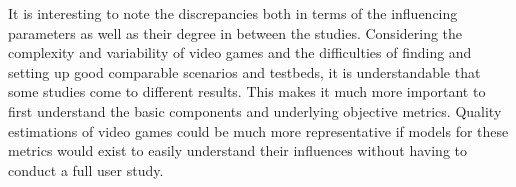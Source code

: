 It is interesting to note the discrepancies both in terms of the influencing parameters as well as their degree in between the studies. Considering the complexity and variability of video games and the difficulties of finding and setting up good comparable scenarios and testbeds, it is understandable that some studies come to different results. This makes it much more important to first understand the basic components and underlying objective metrics. Quality estimations of video games could be much more representative if models for these metrics would exist to easily understand their influences without having to conduct a full user study.















